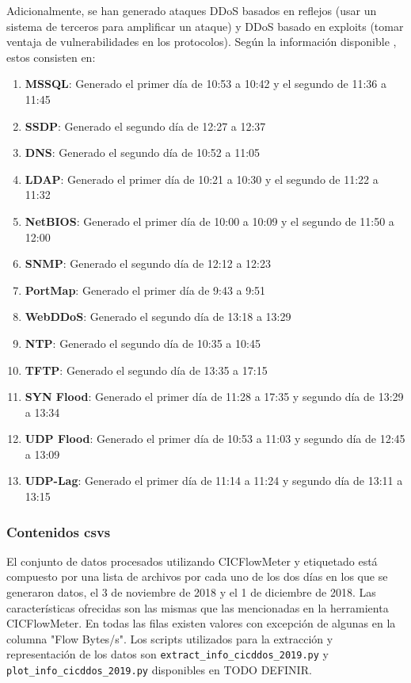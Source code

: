 Adicionalmente, se han generado ataques DDoS basados en reflejos (usar un sistema de terceros para amplificar un ataque) y DDoS basado en exploits (tomar ventaja de vulnerabilidades en los protocolos). Según la información disponible \cite{cicddos2019web}, estos consisten en:

\begin{enumerate}
    \item \textbf{MSSQL}: Generado el primer día de 10:53 a 10:42 y el segundo de 11:36 a 11:45
    \item \textbf{SSDP}: Generado el segundo día de 12:27 a 12:37
    \item \textbf{DNS}: Generado el segundo día de 10:52 a 11:05
    \item \textbf{LDAP}: Generado el primer día de 10:21 a 10:30 y el segundo de 11:22 a 11:32
    \item \textbf{NetBIOS}: Generado el primer día de 10:00 a 10:09 y el segundo de 11:50 a 12:00
    \item \textbf{SNMP}: Generado el segundo día de 12:12 a 12:23
    \item \textbf{PortMap}: Generado el primer día de 9:43 a 9:51
    \item \textbf{WebDDoS}: Generado el segundo día de 13:18 a 13:29
    \item \textbf{NTP}: Generado el segundo día de 10:35 a 10:45
    \item \textbf{TFTP}: Generado el segundo día de 13:35 a 17:15
    \item \textbf{SYN Flood}: Generado el primer día de 11:28 a 17:35 y segundo día de 13:29 a 13:34
    \item \textbf{UDP Flood}: Generado el primer día de 10:53 a 11:03 y segundo día de 12:45 a 13:09
    \item \textbf{UDP-Lag}: Generado el primer día de 11:14 a 11:24 y segundo día de 13:11 a 13:15
\end{enumerate}

\subsubsection{Contenidos csvs}

El conjunto de datos procesados utilizando CICFlowMeter y etiquetado está compuesto por una lista de archivos por cada uno de los dos días en los que se generaron datos, el 3 de noviembre de 2018 y el 1 de diciembre de 2018. Las características ofrecidas son las mismas que las mencionadas en la herramienta CICFlowMeter. En todas las filas existen valores con excepción de algunas en la columna "Flow Bytes/s". Los scripts utilizados para la extracción y representación de los datos son \texttt{extract\_info\_cicddos\_2019.py} y \texttt{plot\_info\_cicddos\_2019.py} disponibles en TODO DEFINIR.


